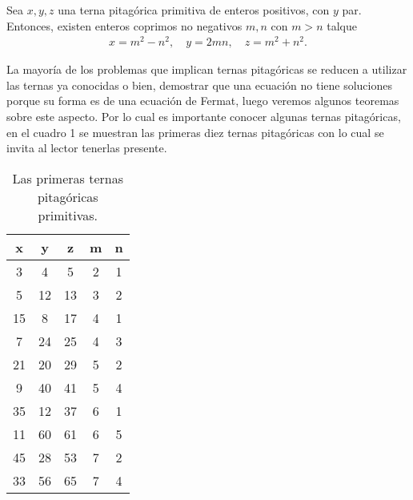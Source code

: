 \begin{theorem.box}{}{}
    Sea $x,y,z$ una terna pitagórica primitiva de enteros positivos, con $y$ par.
    Entonces, existen enteros coprimos no negativos $m,n$ con $m > n$ talque
    \begin{align*}
        x = m^2 - n^2,\quad y = 2mn,\quad z = m^2 + n^2.
    \end{align*}
\end{theorem.box}
La mayoría de los problemas que implican ternas pitagóricas se reducen a utilizar las ternas ya conocidas o bien,
demostrar que una ecuación no tiene soluciones porque su forma es de una ecuación de Fermat, luego veremos algunos teoremas sobre este aspecto.
Por lo cual es importante conocer algunas ternas pitagóricas, en el cuadro 1 se muestran las primeras diez ternas
pitagóricas con lo cual se invita al lector tenerlas presente.
\begin{table}
    \centering
    \begin{tabular}{|c|c|c||c|c|}
        \hline
        x & y & z & m & n\\
        \hline\hline
        3  &  4 &  5 & 2 & 1\\
        5  & 12 & 13 & 3 & 2\\
        15 &  8 & 17 & 4 & 1\\
        7  & 24 & 25 & 4 & 3\\
        21 & 20 & 29 & 5 & 2\\
        9  & 40 & 41 & 5 & 4\\
        35 & 12 & 37 & 6 & 1\\
        11 & 60 & 61 & 6 & 5\\
        45 & 28 & 53 & 7 & 2\\
        33 & 56 & 65 & 7 & 4\\
        \hline
    \end{tabular}
    \caption{Las primeras ternas pitagóricas primitivas.}
\end{table}

